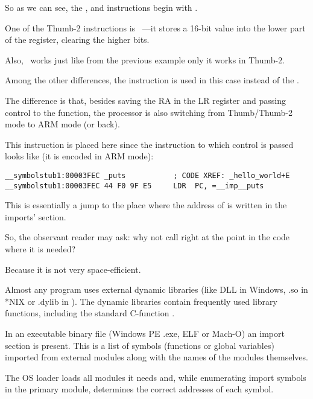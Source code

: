 
So as we can see, the ,  and  instructions begin with .

One of the Thumb-2 instructions is  ~---it stores a 16-bit value into the lower part of the  register, clearing the higher bits.

Also,  ~works just like  from the previous example only it works in Thumb-2.


Among the other differences, the  instruction is used in this case instead of the .

The difference is that, besides saving the \ac{RA} in the \ac{LR} register and passing control 
to the \puts function, the processor is also switching from Thumb/Thumb-2 mode to ARM mode (or back).

This instruction is placed here since the instruction to which control is passed looks like (it is encoded in ARM mode):

\begin{lstlisting}
__symbolstub1:00003FEC _puts           ; CODE XREF: _hello_world+E
__symbolstub1:00003FEC 44 F0 9F E5     LDR  PC, =__imp__puts
\end{lstlisting}

This is essentially a jump to the place where the address of \puts is written in the imports' section.

So, the observant reader may ask: why not call \puts right at the point in the code where it is needed?

Because it is not very space-efficient.

Almost any program uses external dynamic libraries (like DLL in Windows, .so in *NIX or .dylib in \MacOSX).
The dynamic libraries contain frequently used library functions, including the standard C-function \puts.

In an executable binary file (Windows PE .exe, ELF or Mach-O) an import section is present.
This is a list of symbols (functions or global variables) imported from external modules along with the names of the modules themselves.

The \ac{OS} loader loads all modules it needs and, while enumerating import symbols in the primary module, determines the correct addresses of each symbol.

